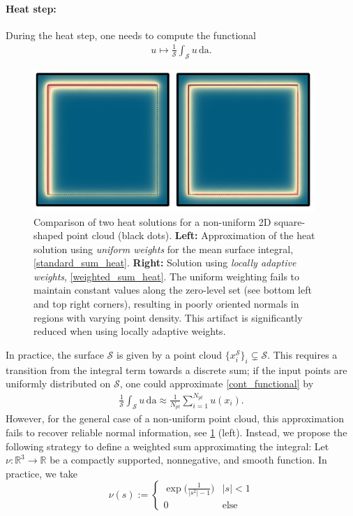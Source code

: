 \documentclass[draft,12pt,openany]{book}
\newcommand{\R}{\mathbb{R}}
\def\S{\mathcal{S}}
\theoremstyle{plainnormal}
\theoremstyle{remark}
\begin{document}
\paragraph{Heat step:}
During the heat step, one needs to compute the functional 
\begin{align} \label{cont_functional}
    u \mapsto \frac{1}{\S}\int_\S u\, \mathrm{da}.
\end{align} 
\begin{figure}[!t]
    \centering
    \includegraphics[width=0.95\textwidth]{Figures/2D_combined2.pdf}
    \caption{ Comparison of two heat solutions for a non-uniform 2D square-shaped point cloud (black dots). \textbf{Left:} Approximation of the heat solution using \emph{uniform weights} for the mean surface integral, \cref{standard_sum_heat}. \textbf{Right:} Solution using \emph{locally adaptive weights}, \cref{weighted_sum_heat}. The uniform weighting fails to maintain constant values along the zero-level set (see bottom left and top right corners), resulting in poorly oriented normals in regions with varying point density. This artifact is significantly reduced when using locally adaptive weights.}
    
\label{heatweights}
\end{figure}In practice, the surface $\S$ is given by a point cloud $\{x_i^\S\}_i\subsetneq\mathcal S$. This requires a transition from the integral term towards a discrete sum; if the input points are  uniformly distributed on $\S$, one could approximate
\cref{cont_functional} by \begin{align}\label{standard_sum_heat}
    \frac{1}{\S}\int_\S u\,\mathrm{da}\approx \frac{1}{N_{pt}}\sum_{i = 1}^{N_{pt}} u(x_i).
\end{align}
However, for the general case of a non-uniform point cloud, this approximation fails to recover reliable normal information, see \cref{heatweights} (left). Instead, we propose the following strategy to define a weighted sum approximating the integral: Let $\nu:\R^3 \rightarrow\R$ be a compactly supported, nonnegative, and smooth function. In practice, we take $$\nu(s) := \begin{cases}
    \exp\Big(\frac{1}{|s^2| - 1}\Big) &|s|<1\\
    0  &\text{else}
\end{cases}$$
\end{document}
